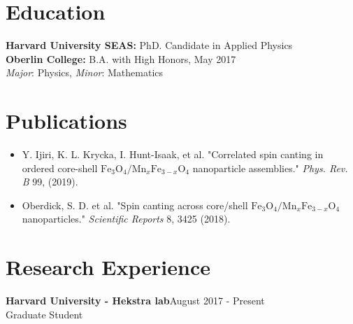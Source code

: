 \documentclass[margin]{res}
\begin{document}
 
 
\address{ianhuntisaak@g.harvard.edu}

 
\begin{resume} 
	 
	\section{Education} 
	\textbf{Harvard University SEAS:} PhD. Candidate in Applied Physics\\%
	\textbf{Oberlin College:} B.A. with High Honors, May 2017 \\
	\textit{Major}: Physics, \textit{Minor}: Mathematics
	 

	\section{Publications}
	\begin{itemize}
		\item Y. Ijiri, K. L. Krycka, I. Hunt-Isaak, et al.  "Correlated spin canting in ordered core-shell $\mathrm{Fe}_3\mathrm{O}_4/\mathrm{Mn}_x\mathrm{Fe}_{3-x}\mathrm{O}_4$ nanoparticle assemblies." {\it Phys. Rev. B} 99, (2019).
		\item Oberdick, S. D. et al.  "Spin canting across core/shell $\mathrm{Fe}_3\mathrm{O}_4/\mathrm{Mn}_x\mathrm{Fe}_{3-x}\mathrm{O}_4$ nanoparticles." {\it Scientific Reports} 8, 3425 (2018).
		
	\end{itemize}
	
	\section{Research Experience}
		{\bf Harvard University - Hekstra lab}\hfill August 2017 - Present\\ 
	Graduate Student
	

\end{resume}
\end{document}
